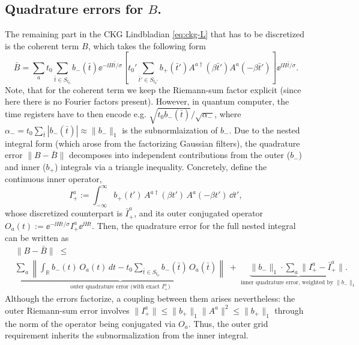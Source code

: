 \smallskip
\label{sec:quad-errors-B}
\subsection{Quadrature errors for $B$.}
The remaining part in the CKG Lindbladian \eqref{eq:ckg-L} that has to be discretized is the coherent term $B$, which takes the following form
\begin{equation} \label{eq:B-discr}
    \bar{B} = \sum_a t_0\sum_{\bar{t}\in S_{t_0}} b_-(\bar{t}) \ee^{-\ii H \bar{t} / \sigma} \left[t_0'\sum_{\bar{t}' \in S_{t_0'}} b_+(\bar{t}') A^{a\dagger}(\beta \bar{t}') A^a(-\beta \bar{t}')\right]\ee^{\ii H \bar{t} / \sigma}.
\end{equation}
Note, that for the coherent term we keep the Riemann-sum factor explicit (since here there is no Fourier factors present). However, in quantum computer, the time registers have to then encode e.g. $\sqrt{t_0 b_-(\bar{t})} / \sqrt{\alpha_-}$, where $\alpha_- = t_0 \sum_{\bar{t}} |b_-(\bar{t})| \approx \|b_-\|_1$ is the subnormlaization of $b_-$.
Due to the nested integral form (which arose from the factorizing Gaussian filters), the quadrature error $\|B - \bar{B}\|$ decomposes into independent contributions from the outer ($b_-$) and inner ($b_+$) integrals via a triangle inequality. Concretely, define the continuous inner operator,
\begin{equation}
    I_+^a := \int_{-\infty}^{\infty} b_+(t')\, A^{a\dagger}(\beta t')\, A^a(-\beta t')\,\dd t',
\end{equation}
whose discretized counterpart is $\bar{I}_+^a$, and its outer conjugated operator $O_a(t) := \ee^{-\ii H t / \sigma} I_+^a \ee^{\ii H t}$. Then, the quadrature error for the full nested integral can be written as
\begin{equation} \label{eq:B-error-factorize}
    \begin{split}
        &\|B - \bar{B}\| \;\leq\; \\
    &\underbrace{\sum_a\left\|\int_\mathbb{R} b_-(t)\,O_a(t)\,dt - t_0\sum_{\bar{t}\in S_{t_0}} b_-(\bar{t})\,O_a(\bar{t})\right\|}_{\text{outer quadrature error (with exact } I_+^a\text{)}}
    \;+\;
    \underbrace{\|b_-\|_1 \cdot \sum_a \|I_+^a - \bar{I}_+^a\|.}_{\text{inner quadrature error, weighted by } \|b_-\|_1}
    \end{split}
\end{equation}
Although the errors factorize, a coupling between them arises nevertheless: 
the outer Riemann-sum error involves $\|I^a_+\| \leq \|b_+\|_1 \|A^a\|^2 \leq \|b_+\|_1$ through the norm of the operator being conjugated via $O_a$. Thus, the outer grid requirement inherits the subnormalization from the inner integral. 

